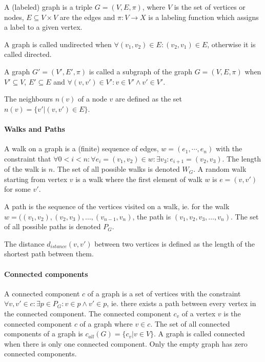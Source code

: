 


A (labeled) graph is a triple $G = (V, E, \pi)$, where $V$ is the set of vertices or nodes, $E \subseteq V \times V$ are the edges and $\pi: V \to X$ is a labeling function which assigns a label to a given vertex.

A graph is called undirected when $\forall (v_1, v_2) \in E: (v_2, v_1) \in E$, otherwise it is called directed.

A graph $G'=(V', E', \pi)$ is called a subgraph of the graph $G = (V, E, \pi)$ when $V' \subseteq V$, $E' \subseteq E$ and $\forall (v, v') \in V': v \in V' \land v' \in V'$.

The neighbours $n(v)$ of a node $v$ are defined as the set $n(v) = \{v' | (v, v') \in E \}$.

\paragraph{Walks and Paths}
A walk on a graph is a (finite) sequence of edges, $w = (e_1, \cdots, e_n)$ with the constraint that $\forall 0 < i < n: \forall e_i = (v_1, v_2) \in w: \exists v_3: e_{i + 1} = (v_2, v_3)$. The length of the walk is $n$.
The set of all possible walks is denoted $W_G$.
A random walk starting from vertex $v$ is a walk where the first element of walk $w$ is $e = (v, v')$ for some $v'$.

A path is the sequence of the vertices visited on a walk, ie. for the walk $w = ((v_1, v_2), (v_2, v_3), \dots, (v_{n-1}, v_n)$, the path is $(v_1, v_2, v_3, \dots, v_n)$.
The set of all possible paths is denoted $P_G$.

The distance $d_{istance}(v, v')$ between two vertices is defined as the length of the shortest path between them.

\paragraph{Connected components}
A connected component $c$ of a graph is a set of vertices with the constraint $\forall v, v' \in c: \exists p \in P_G: v \in p \land v' \in p$, ie. there exists a path between every vertex in the connected component.
The connected component $c_v$ of a vertex $v$ is the connected component $c$ of a graph where $v \in c$.
The set of all connected components of a graph is $c_{all}(G) = \{ c_v | v \in V \}$. A graph is called connected when there is only one connected component. Only the empty graph has zero connected components.

